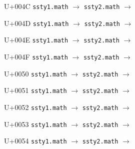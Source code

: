 \documentclass{article}
\begin{document}
\begin{substitutions}
\goodbreak

U+004C  \linebreak
    \texttt{ssty1.math} $\to$  \linebreak
    \texttt{ssty2.math} $\to$  

\goodbreak

U+004D  \linebreak
    \texttt{ssty1.math} $\to$  \linebreak
    \texttt{ssty2.math} $\to$  

\goodbreak

U+004E  \linebreak
    \texttt{ssty1.math} $\to$  \linebreak
    \texttt{ssty2.math} $\to$  

\goodbreak

U+004F  \linebreak
    \texttt{ssty1.math} $\to$  \linebreak
    \texttt{ssty2.math} $\to$  

\goodbreak

U+0050  \linebreak
    \texttt{ssty1.math} $\to$  \linebreak
    \texttt{ssty2.math} $\to$  

\goodbreak

U+0051  \linebreak
    \texttt{ssty1.math} $\to$  \linebreak
    \texttt{ssty2.math} $\to$  

\goodbreak

U+0052  \linebreak
    \texttt{ssty1.math} $\to$  \linebreak
    \texttt{ssty2.math} $\to$  

\goodbreak

U+0053  \linebreak
    \texttt{ssty1.math} $\to$  \linebreak
    \texttt{ssty2.math} $\to$  

\goodbreak

U+0054  \linebreak
    \texttt{ssty1.math} $\to$  \linebreak
    \texttt{ssty2.math} $\to$  


\end{substitutions}
\end{document}
